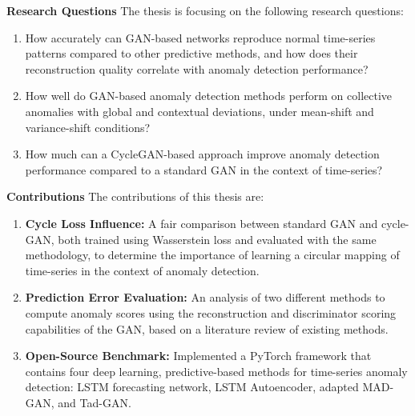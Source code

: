 \textbf{Research Questions} \-\hspace{0.15em} The thesis is focusing on the following research questions:

\begin{enumerate}
    \item How accurately can GAN-based networks reproduce normal time-series patterns compared to other predictive methods, and how does their reconstruction quality correlate with anomaly detection performance? 
    
    \item How well do GAN-based anomaly detection methods perform on collective anomalies with global and contextual deviations, under mean-shift and variance-shift conditions?

    \item How much can a CycleGAN-based approach improve anomaly detection performance compared to a standard GAN in the context of time-series?
\end{enumerate}


\textbf{Contributions} \-\hspace{0.15em} The contributions of this thesis are:

\begin{enumerate}
    \item \textbf{Cycle Loss Influence:} A fair comparison between standard GAN and cycle-GAN, both trained using Wasserstein loss and evaluated with the same methodology, to determine the importance of learning a circular mapping of time-series in the context of anomaly detection.

    \item \textbf{Prediction Error Evaluation:} An analysis of two different methods to compute anomaly scores using the reconstruction and discriminator scoring capabilities of the GAN, based on a literature review of existing methods.
    
    \item \textbf{Open-Source Benchmark:} Implemented a PyTorch framework that contains four deep learning, predictive-based methods for time-series anomaly detection: LSTM forecasting network, LSTM Autoencoder, adapted MAD-GAN, and Tad-GAN. 
\end{enumerate}


